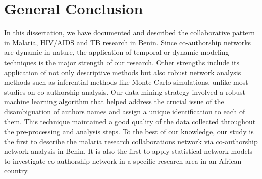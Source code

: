 
\clearpage  %
\chapter*{General Conclusion}
In this dissertation, we have documented and described the collaborative pattern in Malaria, HIV/AIDS and TB research in Benin. 
Since co-authorship networks are dynamic in nature, the application of temporal or dynamic modeling techniques is the major strength of our research. Other strengths include its application of not only descriptive methods but also robust network analysis methods such as inferential methods like Monte-Carlo simulations, unlike most studies on co-authorship analysis. Our data mining strategy involved a robust machine learning algorithm that helped address the crucial issue of the disambiguation of authors names and assign a unique identification to each of them. This technique maintained a good quality of the data collected throughout the pre-processing and analysis steps. To the best of our knowledge, our study is the first to describe the malaria research collaborations network via co-authorship network analysis in Benin. It is also the first to apply statistical network models to investigate co-authorship network in a specific research area in an African country.\\%
